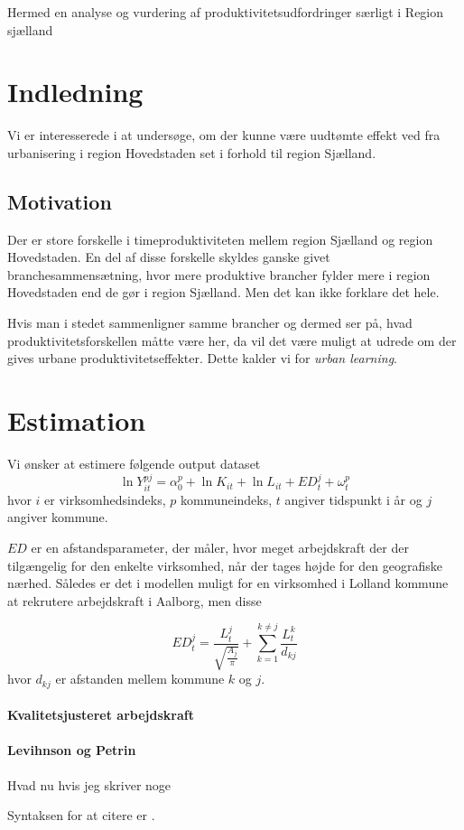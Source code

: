 

Hermed en analyse og vurdering af produktivitetsudfordringer særligt i Region sjælland

\section{Indledning}
Vi er interesserede i at undersøge, om der kunne være uudtømte effekt ved fra urbanisering i region Hovedstaden set i forhold til region Sjælland. 
\subsection{Motivation}
Der er store forskelle i timeproduktiviteten mellem region Sjælland og region Hovedstaden. En del af disse forskelle skyldes ganske givet branchesammensætning, hvor mere produktive brancher fylder mere i region Hovedstaden end de gør i region Sjælland. Men det kan ikke forklare det hele.

Hvis man i stedet sammenligner samme brancher og dermed ser på, hvad produktivitetsforskellen måtte være her, da vil det være muligt at udrede om der gives urbane produktivitetseffekter. Dette kalder vi for \emph{urban learning}.

\section{Estimation}
Vi ønsker at estimere følgende output dataset
\begin{equation}
	\ln Y_{it}^{pj} = \alpha^p_0 + \ln K_{it} + \ln L_{it} + ED^j_{t} + \omega^p_{t}
\end{equation}
hvor $i$ er virksomhedsindeks, $p$ kommuneindeks, $t$ angiver tidspunkt i år og $j$ angiver kommune. 


$ED$ er en afstandsparameter, der måler, hvor meget arbejdskraft der der tilgængelig for den enkelte virksomhed, når der tages højde for den geografiske nærhed. Således er det i modellen muligt for en virksomhed i Lolland kommune at rekrutere arbejdskraft i Aalborg, men disse 

\begin{equation}
 	ED^j_t = \frac{L^j_t}{\sqrt{\frac{A_j}{\pi}}} + \sum_{k=1}^{k \neq j} \frac{L^k_t}{d_{kj}}
 \end{equation} 
 hvor $d_{kj}$ er afstanden mellem kommune $k$ og $j$. 

\paragraph{Kvalitetsjusteret arbejdskraft}



\paragraph{Levihnson og Petrin}
Hvad nu hvis jeg skriver noge

Syntaksen for at citere er \cite[pp. 211ff.]{melo2009meta}. 



